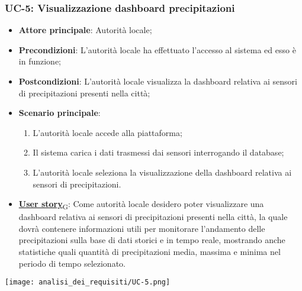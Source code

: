 \subsubsection{UC-5: Visualizzazione dashboard precipitazioni}
\begin{itemize}
	\item \textbf{Attore principale}: Autorità locale;
	\item \textbf{Precondizioni}: L'autorità locale ha effettuato l'accesso al sistema ed esso è in funzione;
	\item \textbf{Postcondizioni}: L'autorità locale visualizza la dashboard relativa
	      ai sensori di precipitazioni presenti nella città;
	\item \textbf{Scenario principale}:
	      \begin{enumerate}
		      \item L'autorità locale accede alla piattaforma;
		      \item Il sistema carica i dati trasmessi dai sensori interrogando il database;
		      \item L'autorità locale seleziona la visualizzazione della dashboard relativa ai sensori di precipitazioni.
	      \end{enumerate}
	\item \href{https://7last.github.io/docs/rtb/documentazione-interna/glossario\#user-story}{\textbf{User story}\textsubscript{G}}:
	      Come autorità locale desidero poter visualizzare una dashboard relativa ai sensori di precipitazioni presenti nella città, la quale
	      dovrà contenere informazioni utili per monitorare l'andamento delle precipitazioni sulla base di dati storici e in tempo reale, mostrando
	      anche statistiche quali quantità di precipitazioni media, massima e minima nel periodo di tempo selezionato.
\end{itemize}
\begin{center}
	\texttt{[image: analisi\_dei\_requisiti/UC-5.png]}
\end{center}

